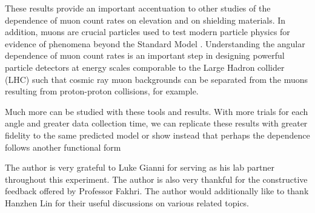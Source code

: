 \documentclass[aps,twocolumn,secnumarabic,balancelastpage,amsmath,amssymb,nofootinbib, floatfix]{revtex4-2}
\begin{document}
	These results provide an important accentuation to other studies of the dependence of muon count rates on elevation and on shielding materials. In addition, muons are crucial particles used to test modern particle physics for evidence of phenomena beyond the Standard Model \cite{muons}. Understanding the angular dependence of muon count rates is an important step in designing powerful particle detectors at energy scales comporable to the Large Hadron collider (LHC) such that cosmic ray muon backgrounds can be separated from the muons resulting from proton-proton collisions, for example.
	
	Much more can be studied with these tools and results. With more trials for each angle and greater data collection time, we can replicate these results with greater fidelity to the same predicted model or show instead that perhaps the dependence follows another functional form
	
	\begin{acknowledgments} The author is very grateful to Luke Gianni for serving as his lab partner throughout this experiment. The author is also very thankful for the constructive feedback offered by Professor Fakhri. The author would additionally like to thank Hanzhen Lin for their useful discussions on various related topics. 
	\end{acknowledgments}
	
	
	
	
\end{document}
